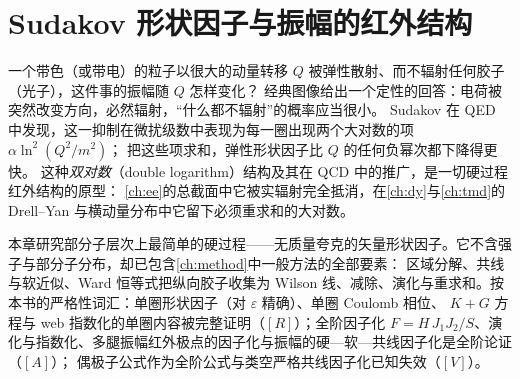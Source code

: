 \chapter{Sudakov 形状因子与振幅的红外结构}\label{ch:sudakov}

一个带色（或带电）的粒子以很大的动量转移 $Q$ 被弹性散射、而不辐射任何胶子（光子），这件事的振幅随 $Q$ 怎样变化？
经典图像给出一个定性的回答：电荷被突然改变方向，必然辐射，“什么都不辐射”的概率应当很小。
Sudakov 在 QED 中发现\cite{Sudakov1956}，这一抑制在微扰级数中表现为每一圈出现两个大对数的项 $\alpha\ln^2(Q^2/m^2)$；
把这些项求和，弹性形状因子比 $Q$ 的任何负幂次都下降得更快。
这种\emph{双对数}（double logarithm）结构及其在 QCD 中的推广，是一切硬过程红外结构的原型：
\cref{ch:ee}的总截面中它被实辐射完全抵消，在\cref{ch:dy}与\cref{ch:tmd}的 Drell--Yan 与横动量分布中它留下必须重求和的大对数。

本章研究部分子层次上最简单的硬过程——无质量夸克的矢量形状因子。它不含强子与部分子分布，却已包含\cref{ch:method}中一般方法的全部要素：
区域分解、共线与软近似、Ward 恒等式把纵向胶子收集为 Wilson 线、减除、演化与重求和。按本书的严格性词汇：单圈形状因子（对 $\varepsilon$ 精确）、单圈 Coulomb 相位、
$K+G$ 方程与 web 指数化的单圈内容被完整证明（$[R]$）；全阶因子化 $F=H\,J_1J_2/S$、演化与指数化、多腿振幅红外极点的因子化与振幅的硬—软—共线因子化是全阶论证（$[A]$）；
偶极子公式作为全阶公式与类空严格共线因子化已知失效（$[V]$）。

